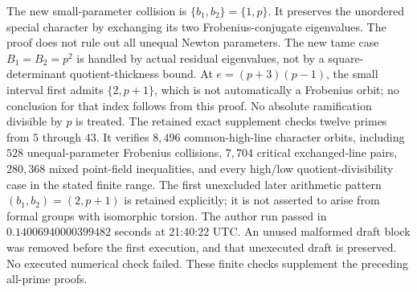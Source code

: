 \begin{remark}
\label{rem:B-RD70-scope}
The new small-parameter collision is \(\{b_1,b_2\}=\{1,p\}\).
It preserves the unordered special character by exchanging its
two Frobenius-conjugate eigenvalues. The proof does not rule out
all unequal Newton parameters.
The new tame case \(B_1=B_2=p^2\) is handled by actual residual
eigenvalues, not by a square-determinant quotient-thickness bound.
At \(e=(p+3)(p-1)\), the small interval first admits
\(\{2,p+1\}\), which is not automatically a Frobenius orbit;
no conclusion for that index follows from this proof.
No absolute ramification divisible by \(p\) is treated.
The retained exact supplement
checks twelve primes from \(5\) through \(43\).
It verifies \(8{,}496\) common-high-line character orbits,
including \(528\) unequal-parameter Frobenius collisions,
\(7{,}704\) critical exchanged-line pairs,
\(280{,}368\) mixed point-field inequalities, and every
high/low quotient-divisibility case in the stated finite range.
The first unexcluded later arithmetic pattern
\((b_1,b_2)=(2,p+1)\) is retained explicitly; it is not
asserted to arise from formal groups with isomorphic torsion.
The author run passed in \(0.14006940000399482\) seconds at
21:40:22 UTC. An unused malformed draft block was removed
before the first execution, and that unexecuted draft is
preserved. No executed numerical check failed.
These finite checks supplement the preceding all-prime proofs.
\end{remark}
